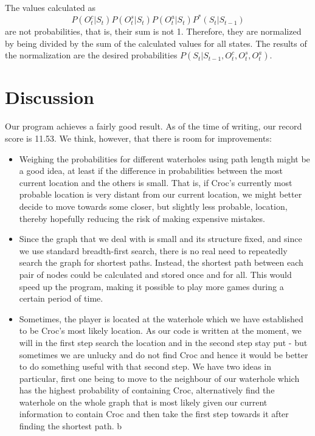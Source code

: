 \documentclass[a4paper]{article}
\begin{document}
The values calculated as
\begin{equation*}
  P(O^c_t|S_t)P(O^s_t|S_t)P(O^a_t|S_t)P^*(S_t|S_{t-1})
\end{equation*}
are not probabilities, that is, their sum is not 1. Therefore, they are
normalized by being divided by the sum of the calculated values for all
states. The results of the normalization are the desired probabilities $P(S_t|S_{t-1}, O^c_t, O^s_t, O^a_t)$.

\section{Discussion}

Our program achieves a fairly good result. As of the time of writing, our
record score is 11.53. We think, however, that there is room for improvements:
\begin{itemize}
\item Weighing the probabilities for different waterholes using path length
  might be a good idea, at least if the difference in probabilities between
  the most current location and the others is small. That is, if Croc's currently most probable location is
  very distant from our current location, we might better decide to move
  towards some closer, but slightly less probable, location, thereby hopefully
  reducing the risk of making expensive mistakes.
\item Since the graph that we deal with is small and its structure fixed, and since we use standard breadth-first
  search, there is no real need to repeatedly search the graph for shortest
  paths. Instead, the shortest path between each pair of nodes could be
  calculated and stored once and for all. This would speed up the program,
  making it possible to play more games during a certain period of time.
  \item Sometimes, the player is located at the waterhole which we have established to be Croc's most likely location.
  As our code is written at the moment, we will in the first step search the location and in the second step stay put -
  but sometimes we are unlucky and do not find Croc and hence it would be better to do something useful
  with that second step. We have two ideas in particular, first one being to move to the neighbour of our waterhole 
  which has the highest probability of containing Croc, alternatively find the waterhole on the whole graph that 
  is most likely given our current information to contain Croc and then take the first step towards it after finding 
  the shortest path.
  b
\end{itemize}
\end{document}
